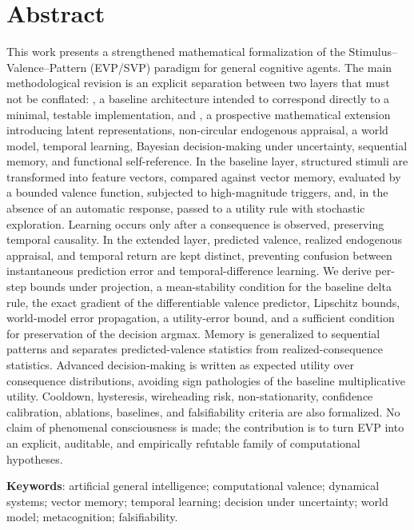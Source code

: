 \section*{Abstract}
\begin{singlespace}
This work presents a strengthened mathematical formalization of the Stimulus--Valence--Pattern (EVP/SVP) paradigm for general cognitive agents. The main methodological revision is an explicit separation between two layers that must not be conflated: \EVPB, a baseline architecture intended to correspond directly to a minimal, testable implementation, and \EVPM, a prospective mathematical extension introducing latent representations, non-circular endogenous appraisal, a world model, temporal learning, Bayesian decision-making under uncertainty, sequential memory, and functional self-reference. In the baseline layer, structured stimuli are transformed into feature vectors, compared against vector memory, evaluated by a bounded valence function, subjected to high-magnitude triggers, and, in the absence of an automatic response, passed to a utility rule with stochastic exploration. Learning occurs only after a consequence is observed, preserving temporal causality. In the extended layer, predicted valence, realized endogenous appraisal, and temporal return are kept distinct, preventing confusion between instantaneous prediction error and temporal-difference learning. We derive per-step bounds under projection, a mean-stability condition for the baseline delta rule, the exact gradient of the differentiable valence predictor, Lipschitz bounds, world-model error propagation, a utility-error bound, and a sufficient condition for preservation of the decision argmax. Memory is generalized to sequential patterns and separates predicted-valence statistics from realized-consequence statistics. Advanced decision-making is written as expected utility over consequence distributions, avoiding sign pathologies of the baseline multiplicative utility. Cooldown, hysteresis, wireheading risk, non-stationarity, confidence calibration, ablations, baselines, and falsifiability criteria are also formalized. No claim of phenomenal consciousness is made; the contribution is to turn EVP into an explicit, auditable, and empirically refutable family of computational hypotheses.

\textbf{Keywords}: artificial general intelligence; computational valence; dynamical systems; vector memory; temporal learning; decision under uncertainty; world model; metacognition; falsifiability.
\end{singlespace}

